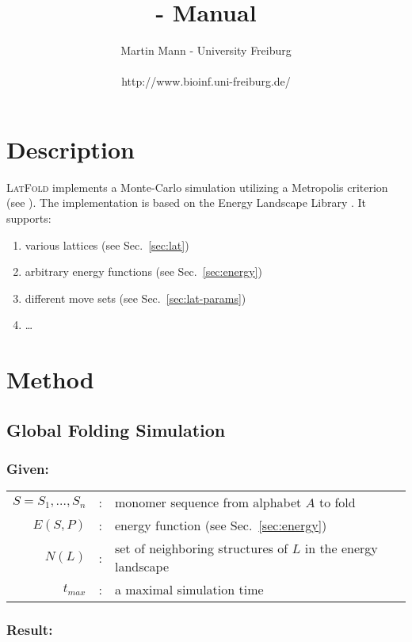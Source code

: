 \documentclass{article}
\title{\latfold{} - Manual}
\date{}
\author{Martin Mann - University Freiburg \\\\
{http://www.bioinf.uni-freiburg.de/}}
\newcommand{\latfold}{\textsc{LatFold}}
\begin{document}
\maketitle



\section{Description}

\latfold{} implements a Monte-Carlo simulation utilizing a Metropolis criterion
(see \cite{Mann:latpack:HFSP08}). The implementation is based on the Energy
Landscape Library \cite{Mann:ELL:BIRD07}. It supports:

\begin{enumerate}
  \item various lattices (see Sec.~\ref{sec:lat})
  \item arbitrary energy functions (see Sec.~\ref{sec:energy})
  \item different move sets (see Sec.~\ref{sec:lat-params})
  \item \ldots
\end{enumerate}

\section{Method}
\label{sec:method}


\subsection{Global Folding Simulation}
\label{sec:MC}

\subsubsection*{Given:}

\begin{tabular}{rcl}
	$S=S_1,\ldots,S_n$ &:& monomer sequence from alphabet $A$ to fold \\
	$E(S,P)$ &:& energy function (see Sec.~\ref{sec:energy})\\
	$N(L)$ &:& set of neighboring structures of $L$ in the energy landscape \\
	$t_{max}$	&:& a maximal simulation time
\end{tabular}

\subsubsection*{Result:}
\end{document}
